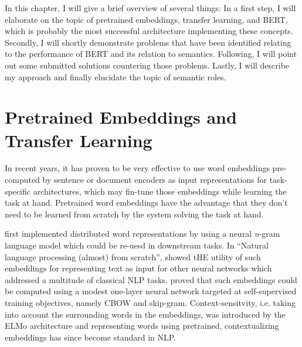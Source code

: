 \label{chap:2_approach}



In this chapter, I will give a brief overview of several things: In a first step, I will
elaborate on the topic of pretrained embeddings, transfer learning, and BERT, which is
probably the most successful architecture implementing these concepts. Secondly, I will
shortly demonstrate problems that have been identified relating to the performance of
BERT and its relation to semantics. Following, I will point out some submitted solutions
countering those problems. Lastly, I will describe my approach and finally elucidate the
topic of semantic roles.



\section{Pretrained Embeddings and Transfer Learning}
\label{sec:pretrained-embeddings}

In recent years, it has proven to be very effective to use word embeddings pre-computed by sentence
or document encoders as input representations for task-specific architectures, which may fin-tune
those embeddings while learning the task at hand. Pretrained word embeddings have the advantage
that they don't need to be learned from scratch by the system solving the task at hand.


\cite{bengio2003neural} first implemented distributed word representations by using a neural
\textit{n}-gram language model which could be re-uesd in downstream tasks. In ``Natural language
processing (almost) from scratch'', \cite{collobert2011natural} showed tHE utility of such
embeddings for representing text as input for other neural networks which addressed a multitude
of classical NLP tasks. \cite{mikolov2013distributed} proved that such embeddings could be
computed using a modest one-layer neural network targeted at self-supervised training objectives,
namely CBOW and skip-gram. Context-sensitvity, i.e. taking into account the surrounding words in
the embeddings, was introduced by the ELMo architecture \cite{peng2019transfer} and representing
words using pretrained, contextualizing embeddings has since become standard in NLP.



